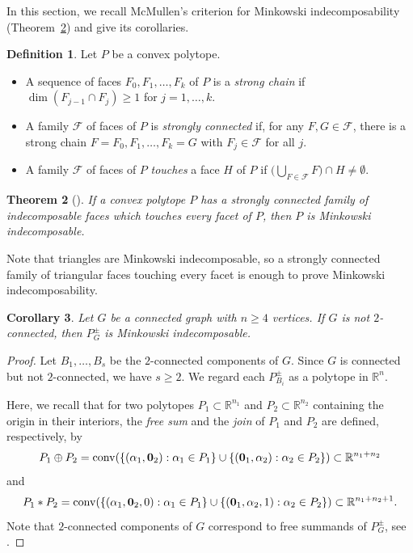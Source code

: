 \documentclass[11pt,a4paper]{amsart}
\newtheorem{theorem}{Theorem}[section]
\newtheorem{corollary}[theorem]{Corollary}
\theoremstyle{definition}
\newtheorem{definition}[theorem]{Definition}
\theoremstyle{remark}
\newcommand{\RR}{\mathbb R}
\newcommand{\Fc}{{\mathcal F}}
\newcommand{\conv}{\operatorname{conv}}
\begin{document}
{In this section, we recall McMullen's criterion for Minkowski indecomposability (Theorem~\ref{thm:mcmullen}) and give its corollaries. 

\begin{definition}\label{def:Mc}
Let $P$ be a convex polytope. 
\begin{itemize}
\item A sequence of faces $F_0,F_1,\ldots,F_k$ of $P$ is a \emph{strong chain} if $\dim(F_{j-1}\cap F_j)\ge 1$ for $j=1,\ldots,k$. 
\item A family $\Fc$ of faces of $P$ is \emph{strongly connected} if, for any $F,G\in\Fc$, there is a strong chain $F=F_0,F_1,\ldots,F_k=G$ with $F_j\in\Fc$ for all $j$. 
\item A family $\Fc$ of faces of $P$ \emph{touches} a face $H$ of $P$ if $\bigl(\bigcup_{F\in\Fc}F\bigr)\cap H\ne\emptyset$. 
\end{itemize}
\end{definition}

\begin{theorem}[{\cite[Theorem~2]{McM}}]\label{thm:mcmullen}
If a convex polytope $P$ has a strongly connected family of indecomposable faces which touches every facet of $P$, then $P$ is Minkowski indecomposable. 
\end{theorem}

Note that triangles are Minkowski indecomposable, so a strongly connected family of triangular faces touching every facet is enough to prove Minkowski indecomposability. 
\begin{corollary}\label{cor:2-conn}
Let $G$ be a connected graph with $n\ge 4$ vertices. If $G$ is not $2$-connected, then $P_G^\pm$ is Minkowski indecomposable. 
\end{corollary}
\begin{proof}
Let $B_1,\ldots,B_s$ be the $2$-connected components of $G$. Since $G$ is connected but not $2$-connected, we have $s\ge 2$. 
We regard each $P_{B_i}^{\pm}$ as a polytope in $\RR^n$. 

Here, we recall that for two polytopes $P_1 \subset \RR^{n_1}$ and $P_2 \subset \RR^{n_2}$ containing the origin in 
their interiors, the \emph{free sum} and the \emph{join} of $P_1$ and $P_2$ are defined, respectively, by
\[P_1 \oplus P_2 = \conv(\{(\alpha_1,{\bf 0}_2) : \alpha_1 \in P_1\} \cup \{({\bf 0}_1, \alpha_2) : \alpha_2 \in P_2\}) \subset \RR^{n_1+n_2}\] 
and 
\[P_1 * P_2 = \conv(\{(\alpha_1,{\bf 0}_2,0) : \alpha_1 \in P_1\} \cup \{({\bf 0}_1, \alpha_2,1) : \alpha_2 \in P_2\}) \subset \RR^{n_1+n_2+1}.\] 
Note that $2$-connected components of $G$ correspond to free summands of $P_G^\pm$, see \cite{MHNOH}. 



\end{proof}}
\end{document}
